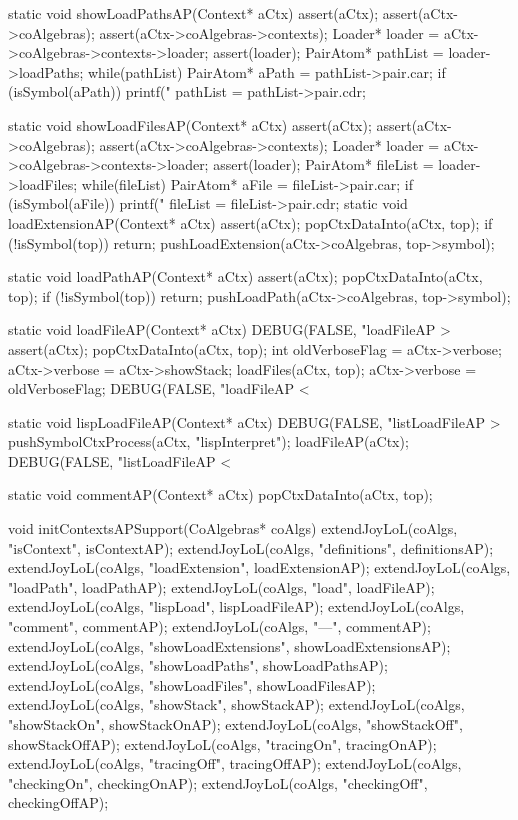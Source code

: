 static void showLoadPathsAP(Context* aCtx) {
  assert(aCtx);
  assert(aCtx->coAlgebras);
  assert(aCtx->coAlgebras->contexts);
  Loader* loader = aCtx->coAlgebras->contexts->loader;
  assert(loader);
  PairAtom* pathList = loader->loadPaths;
  while(pathList) {
    PairAtom* aPath = pathList->pair.car;
    if (isSymbol(aPath)) printf("%
    pathList = pathList->pair.cdr;
  }
}

static void showLoadFilesAP(Context* aCtx) {
  assert(aCtx);
  assert(aCtx->coAlgebras);
  assert(aCtx->coAlgebras->contexts);
  Loader* loader = aCtx->coAlgebras->contexts->loader;
  assert(loader);
  PairAtom* fileList = loader->loadFiles;
  while(fileList) {
    PairAtom* aFile = fileList->pair.car;
    if (isSymbol(aFile)) printf("%
    fileList = fileList->pair.cdr;
  }
}
static void loadExtensionAP(Context* aCtx) {
  assert(aCtx);
  popCtxDataInto(aCtx, top);
  if (!isSymbol(top)) return;
  pushLoadExtension(aCtx->coAlgebras, top->symbol);
}

static void loadPathAP(Context* aCtx) {
  assert(aCtx);
  popCtxDataInto(aCtx, top);
  if (!isSymbol(top)) return;
  pushLoadPath(aCtx->coAlgebras, top->symbol);
}

static void loadFileAP(Context* aCtx) {
  DEBUG(FALSE, "loadFileAP > %
  assert(aCtx);
  popCtxDataInto(aCtx, top);
  int oldVerboseFlag = aCtx->verbose;
  aCtx->verbose = aCtx->showStack;
  loadFiles(aCtx, top);
  aCtx->verbose = oldVerboseFlag;
  DEBUG(FALSE, "loadFileAP < %
}

static void lispLoadFileAP(Context* aCtx) {
  DEBUG(FALSE, "listLoadFileAP > %
  pushSymbolCtxProcess(aCtx, "lispInterpret");
  loadFileAP(aCtx);
  DEBUG(FALSE, "listLoadFileAP < %
}

static void commentAP(Context* aCtx) {
  popCtxDataInto(aCtx, top);
}

void initContextsAPSupport(CoAlgebras* coAlgs) {
  extendJoyLoL(coAlgs, "isContext",           isContextAP);
  extendJoyLoL(coAlgs, "definitions",         definitionsAP);
  extendJoyLoL(coAlgs, "loadExtension",       loadExtensionAP);
  extendJoyLoL(coAlgs, "loadPath",            loadPathAP);
  extendJoyLoL(coAlgs, "load",                loadFileAP);
  extendJoyLoL(coAlgs, "lispLoad",            lispLoadFileAP);
  extendJoyLoL(coAlgs, "comment",             commentAP);
  extendJoyLoL(coAlgs, "---",                 commentAP);
  extendJoyLoL(coAlgs, "showLoadExtensions",  showLoadExtensionsAP);
  extendJoyLoL(coAlgs, "showLoadPaths",       showLoadPathsAP);
  extendJoyLoL(coAlgs, "showLoadFiles",       showLoadFilesAP);
  extendJoyLoL(coAlgs, "showStack",           showStackAP);
  extendJoyLoL(coAlgs, "showStackOn",         showStackOnAP);
  extendJoyLoL(coAlgs, "showStackOff",        showStackOffAP);
  extendJoyLoL(coAlgs, "tracingOn",           tracingOnAP);
  extendJoyLoL(coAlgs, "tracingOff",          tracingOffAP);
  extendJoyLoL(coAlgs, "checkingOn",          checkingOnAP);
  extendJoyLoL(coAlgs, "checkingOff",         checkingOffAP);
}